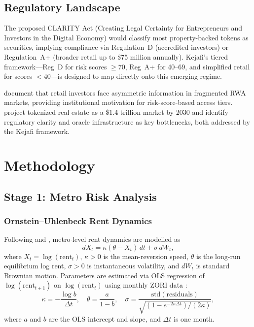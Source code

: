\documentclass[11pt,letterpaper]{article}
\begin{document}
\subsection{Regulatory Landscape}

The proposed CLARITY Act (Creating Legal Certainty for Entrepreneurs and Investors in the
Digital Economy) would classify most property-backed tokens as securities, implying
compliance via Regulation~D (accredited investors) or Regulation~A+ (broader retail up to
\$75 million annually). Kejafi's tiered framework---Reg~D for risk scores $\geq 70$,
Reg~A+ for 40--69, and simplified retail for scores $< 40$---is designed to map directly
onto this emerging regime.

\citet{bis2025} document that retail investors face asymmetric information in fragmented
RWA markets, providing institutional motivation for risk-score-based access tiers.
\citet{deloitte2025} project tokenized real estate as a \$1.4 trillion market by 2030 and
identify regulatory clarity and oracle infrastructure as key bottlenecks, both addressed by
the Kejafi framework.

\section{Methodology}
\label{sec:methodology}

\subsection{Stage 1: Metro Risk Analysis}

\subsubsection{Ornstein--Uhlenbeck Rent Dynamics}

Following \citet{vasicek1977} and \citet{case1989}, metro-level rent dynamics are modelled
as
\begin{equation}
dX_t = \kappa(\theta - X_t)\,dt + \sigma\,dW_t,
\label{eq:ou}
\end{equation}
where $X_t = \log(\text{rent}_t)$, $\kappa > 0$ is the mean-reversion speed, $\theta$ is
the long-run equilibrium log rent, $\sigma > 0$ is instantaneous volatility, and $dW_t$ is
standard Brownian motion. Parameters are estimated via OLS regression of
$\log(\text{rent}_{t+1})$ on $\log(\text{rent}_t)$ using monthly ZORI data \citep{zillow2022}:
\begin{equation}
\kappa = -\frac{\log b}{\Delta t}, \quad
\theta = \frac{a}{1-b}, \quad
\sigma = \frac{\text{std}(\text{residuals})}{\sqrt{(1-e^{-2\kappa\Delta t})/(2\kappa)}},
\label{eq:ou_params}
\end{equation}
where $a$ and $b$ are the OLS intercept and slope, and $\Delta t$ is one month.
\end{document}
